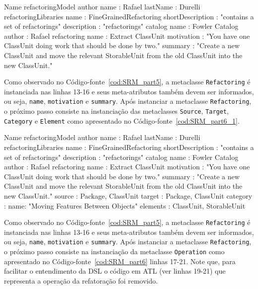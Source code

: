 \begin{codigo}[caption={[Exemplo de uso da DSL - parte 5.] Exemplo de uso da DSL - parte 5.},escapeinside={(*@}{@*)}, basicstyle=\footnotesize, label={cod:SRM_part5}, language=myDSL]{Name}
refactoringModel {
    author {
		name : Rafael
		lastName : Durelli
	}
	refactoringLibraries {
	    name : FineGrainedRefactoring
		shortDescription : "contains a set of refactorings"
		description : "refactorings"
		catalog {
			name : Fowler Catalog
			author : Rafael
			refactoring {
				name : Extract ClassUnit
				motivation : "You have one ClassUnit doing work that should be done by two."
				summary : "Create a new ClassUnit and move the relevant StorableUnit from the old ClassUnit into the new ClassUnit."
			}
		}
	}
}
\end{codigo}


Como observado no Código-fonte~\ref{cod:SRM_part5}, a metaclasse \texttt{Refactoring} é instanciada nas linhas 13-16 e seus meta-atributos também devem ser informados, ou seja, \texttt{name}, \texttt{motivation} e \texttt{summary}. Após instanciar a metaclasse \texttt{Refactoring}, o próximo passo consiste na instanciação das metaclasses \texttt{Source}, \texttt{Target}, \texttt{Category} e \texttt{Element} como apresentado no Código-fonte~\ref{cod:SRM_part6_1}.


\begin{codigo}[caption={[Exemplo de uso da DSL - parte 5.] Exemplo de uso da DSL - parte 5.},escapeinside={(*@}{@*)}, basicstyle=\footnotesize, label={cod:SRM_part6_1}, language=myDSL]{Name}
refactoringModel {
    author {
		name : Rafael
		lastName : Durelli
	}
	refactoringLibraries {
	    name : FineGrainedRefactoring
		shortDescription : "contains a set of refactorings"
		description : "refactorings"
		catalog {
			name : Fowler Catalog
			author : Rafael
			refactoring {
				name : Extract ClassUnit
				motivation : "You have one ClassUnit doing work that should be done by two."
				summary : "Create a new ClassUnit and move the relevant StorableUnit from the old ClassUnit into the new ClassUnit."
				source : {
				    Package, ClassUnit
				}
				target : {
				    Package, ClassUnit
				}
				category : {
				    name: "Moving Features Between Objects"
				}
				elements : {
				    ClassUnit, StorableUnit
				}
			}
		}
	}
}
\end{codigo}


Como observado no Código-fonte~\ref{cod:SRM_part5}, a metaclasse \texttt{Refactoring} é instanciada nas linhas 13-16 e seus meta-atributos também devem ser informados, ou seja, \texttt{name}, \texttt{motivation} e \texttt{summary}. Após instanciar a metaclasse \texttt{Refactoring}, o próximo passo consiste na instanciação da metaclasse \texttt{Operation} como apresentado no Código-fonte~\ref{cod:SRM_part6} linhas 17-21. Note que, para facilitar o entendimento da DSL o código em ATL (ver linhas 19-21) que representa a operação da refatoração foi removido.

